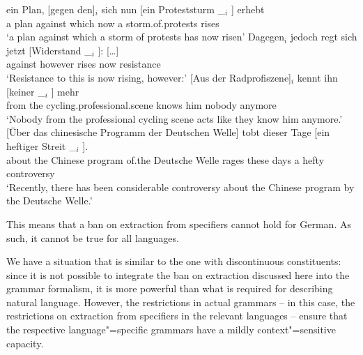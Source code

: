 \begin{sloppypar}
\ex 
\gll ein Plan, [gegen den]$_i$ sich nun [ein Proteststurm \_$_i$ ] erhebt\footnotemark\\
     a plan \spacebr{}against which  now \spacebr{}a storm.of.protests {} {} rises\\
\glt `a plan against which a storm of protests has now risen'
\ex 
\gll {}Dagegen$_i$ jedoch regt sich jetzt [Widerstand \_$_i$ ]: [\ldots]\footnotemark\\
	{}against however rises  now \spacebr{}resistance {}\\
\glt `Resistance to this is now rising, however:'
\ex
\gll {}[Aus der Radprofiszene]$_i$ kennt ihn [keiner \_$_i$ ] mehr\footnotemark\\
	 {}\spacebr{}from the cycling.professional.scene knows him \spacebr{}nobody {} {} anymore\\
\glt `Nobody from the professional cycling scene acts like they know him anymore.'
\ex 
\gll {}[Über das chinesische Programm der Deutschen Welle] tobt dieser Tage [ein heftiger Streit \_$_i$ ].\footnotemark\\
     \spacebr{}about the Chinese program of.the Deutsche Welle rages these days \spacebr{}a hefty controversy\\
\glt `Recently, there has been considerable controversy about the Chinese program by the Deutsche Welle.'
\zl
\end{sloppypar}

\noindent
This means that a ban on extraction from specifiers cannot hold for German. As such, it cannot be true for all languages.

We have a situation that is similar to the one with discontinuous constituents: since it is not possible to integrate
the ban on extraction discussed here into the grammar formalism, it is more powerful than what is required
for describing natural language. However, the restrictions in actual grammars -- in this case, the restrictions on
extraction from specifiers in the relevant languages -- ensure that the respective language"=specific grammars have a mildly context"=sensitive
capacity.



